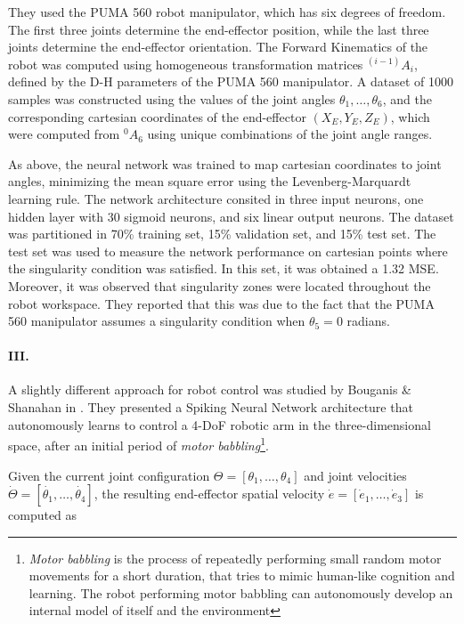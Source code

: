 \documentclass[10pt,a4paper, final]{report} %
\begin{document}
They used the PUMA 560 robot manipulator, which has six degrees of freedom. The first three joints determine the end-effector position, while the last three joints determine the end-effector orientation. 
The Forward Kinematics of the robot was computed using homogeneous transformation matrices $^{(i-1)}A_i$, defined by the D-H parameters of the PUMA 560 manipulator. A dataset of 1000 samples was constructed using the values of the joint angles $\theta_1, \ldots, \theta_6$, and the corresponding cartesian coordinates of the end-effector $(X_E,Y_E,Z_E)$, which were computed from $^0A_6$ using unique combinations of the joint angle ranges.

As above, the neural network was trained to map cartesian coordinates to joint angles, minimizing the mean square error using the Levenberg-Marquardt learning rule. The network architecture consited in three input neurons, one hidden layer with 30 sigmoid neurons, and six linear output neurons. The dataset was partitioned in 70\% training set, 15\% validation set, and 15\% test set. The test set was used to measure the network performance on cartesian points where the singularity condition was satisfied. In this set, it was obtained a 1.32 MSE.
Moreover, it was observed that singularity zones were located throughout the robot workspace. They reported that this was due to the fact that the PUMA 560 manipulator assumes a singularity condition when $\theta_5 = 0$ radians.

\paragraph{III.}
A slightly different approach for robot control was studied by Bouganis \& Shanahan in \cite{bouganis2010training}. They presented a Spiking Neural Network architecture that autonomously learns to control a 4-DoF robotic arm in the three-dimensional space, after an initial period of \textit{motor babbling}\footnote{\textit{Motor babbling} is the process of repeatedly performing small random motor movements for a short duration, that tries to mimic human-like cognition and learning. The robot performing motor babbling can autonomously develop an internal model of itself and the environment}.

Given the current joint configuration $\Theta = [\theta_1, \ldots, \theta_4]$ and joint velocities $\dot{\Theta} = [\dot{\theta_1}, \ldots, \dot{\theta_4}]$, the resulting end-effector spatial velocity $\dot{e} = [\dot{e}_1, \ldots, \dot{e}_3]$ is computed as
\end{document}
